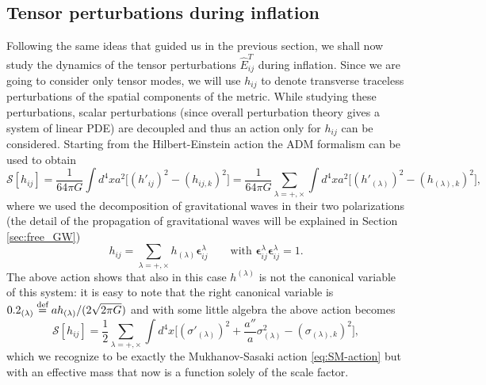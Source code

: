 \subsection{Tensor perturbations during inflation}
Following the same ideas that guided us in the previous section, we shall now study the dynamics of the tensor perturbations $\hat E_{ij}^T$ during inflation. Since we are going to consider only tensor modes, we will use $h_{ij}$ to denote transverse traceless perturbations of the spatial components of the metric. While studying these perturbations, scalar perturbations (since overall perturbation theory gives a system of linear PDE) are decoupled and thus an action only for $h_{ij}$ can be considered. Starting from the Hilbert-Einstein action the ADM formalism can be used to obtain
\begin{equation}
    \label{eq:tensor_perturb_action}
    \mathcal{S} [h_{ij}]=\frac{1}{64\pi G}\int d^4xa^2\Big[(h'_{ij})^2-(h_{ij,k})^2\Big]=\frac{1}{64\pi G}\sum_{\lambda=+,\times}\int d^4xa^2\Big[(h'_{(\lambda)})^2-(h_{(\lambda),k})^2\Big],
\end{equation}
where we used the decomposition of gravitational waves in their two polarizations (the detail of the propagation of gravitational waves will be explained in Section \ref{sec:free_GW})
$$h_{ij}=\sum_{\lambda=+,\times}h_{(\lambda)}\boldsymbol\epsilon^\lambda_{ij}\qquad \text{with }\boldsymbol{\epsilon}^\lambda_{ij}\boldsymbol{\epsilon}^{\lambda}_{ij}=1.$$
The above action shows that also in this case $h^{(\lambda)}$ is not the canonical variable of this system: it is easy to note that the right canonical variable is $0.2_{(\lambda)}\stackrel{\text{def}}{=} ah_{(\lambda)}/(2\sqrt{2\pi G})$ and with some little algebra the above action becomes
\begin{equation}
    \mathcal{S} [h_{ij}]=\frac{1}{2}\sum_{\lambda=+,\times}\int d^4x\Big[(\sigma'_{(\lambda)})^2+\frac{a''}{a}\sigma_{(\lambda)}^2-(\sigma_{(\lambda),k})^2\Big],
\end{equation}
which we recognize to be exactly the Mukhanov-Sasaki action \eqref{eq:SM-action} but with an effective mass that now is a function solely of the scale factor.

